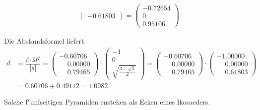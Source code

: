 \begin{loesung}
\begin{teilaufgaben}
\begin{align*}
\begin{pmatrix}
  -0.61803
\end{pmatrix}
=\begin{pmatrix}
  -0.72654\\
   0\\
   0.95106    
\end{pmatrix}
\end{align*}
\item
Die Abstandsformel liefert:
\begin{align*}
d&=\frac{\vec n\cdot \overrightarrow{SP_1}}{|\vec n|}
=
\begin{pmatrix}
-0.60706\\
\phantom{-}0.00000\\
\phantom{-}0.79465
\end{pmatrix}
\cdot
\begin{pmatrix}
-1\\0\\\sqrt{\frac{3-\sqrt{5}}2}
\end{pmatrix}
=
\begin{pmatrix}
-0.60706\\
\phantom{-}0.00000\\
\phantom{-}0.79465
\end{pmatrix}
\cdot
\begin{pmatrix}
-1.00000\\
\phantom{-}0.00000\\
\phantom{-}0.61803
\end{pmatrix}
\\
&=
0.60706+0.49112
=
1.0982.
\end{align*}
\end{teilaufgaben}
\end{loesung}

\begin{diskussion}
Solche f"unfseitigen Pyramiden enstehen als Ecken eines Ikosaeders.
\end{diskussion}

